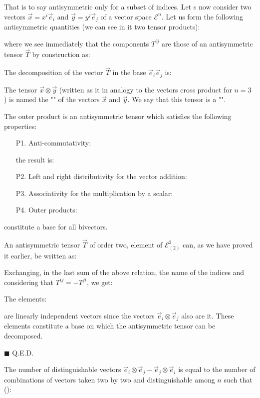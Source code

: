 	That is to say antisymmetric only for a subset of indices.
	Let s now consider two vectors $\vec{x}=x^i\vec{e}_i$ and $\vec{y}=y^j\vec{e}_j$ of a vector space $\mathcal{E}^n$. Let us form the following antisymmetric quantities (we can see in it two tensor products):
	
	where we see immediately that the components $T^{ij}$ are those of an antisymmetric tensor $\vec{T}$ by construction as:
	
	The decomposition of the vector $\vec{T}$ in the base $\vec{e}_i\vec{e}_j$ is:
	
	The tensor $\vec{x}\otimes\vec{y}$ (written as it in analogy to the vectors cross product for $n=3$ ) is named the "" of the vectors $\vec{x}$ and $\vec{y}$. We say that this tensor is a "".
	
	The outer product is an antisymmetric tensor which satisfies the following properties:
	\begin{enumerate}
		\item[P1.] Anti-commutativity:
		
		the result is:
		

		\item[P2.] Left and right distributivity for the vector addition:
		

		\item[P3.] Associativity for the multiplication by a scalar:
		

		\item[P4.] Outer products:
		
	\end{enumerate}
	constitute a base for all bivectors.
	\begin{dem}
	An antisymmetric tensor $\vec{T}$ of order two, element of $\mathcal{E}_{(2)}^2$ can, as we have proved it earlier, be written as:
	
	Exchanging, in the last sum of the above relation, the name of the indices and considering that $T^{ij}=-T^{ji}$, we get:
	
	The elements:
	
	are linearly independent vectors since the vectors $\vec{e}_i\otimes\vec{e}_j$ also are it. These elements constitute a base on which the antisymmetric tensor can be decomposed.
	\begin{flushright}
		$\blacksquare$  Q.E.D.
	\end{flushright}
	\end{dem}
	The number of distinguishable vectors $\vec{e}_i\otimes\vec{e}_j-\vec{e}_j\otimes\vec{e}_i$ is equal to the number of combinations of vectors taken two by two and distinguishable among $n$ such that ():
	
